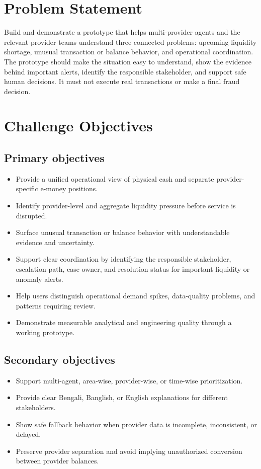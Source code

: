 \documentclass[11pt,a4paper]{article}
\begin{document}
\section{Problem Statement}
Build and demonstrate a prototype that helps multi-provider agents and the relevant provider teams understand three connected problems: upcoming liquidity shortage, unusual transaction or balance behavior, and operational coordination. The prototype should make the situation easy to understand, show the evidence behind important alerts, identify the responsible stakeholder, and support safe human decisions. It must not execute real transactions or make a final fraud decision.

\section{Challenge Objectives}
\subsection*{Primary objectives}
\begin{itemize}[noitemsep]
    \item Provide a unified operational view of physical cash and separate provider-specific e-money positions.
    \item Identify provider-level and aggregate liquidity pressure before service is disrupted.
    \item Surface unusual transaction or balance behavior with understandable evidence and uncertainty.
    \item Support clear coordination by identifying the responsible stakeholder, escalation path, case owner, and resolution status for important liquidity or anomaly alerts.
    \item Help users distinguish operational demand spikes, data-quality problems, and patterns requiring review.
    \item Demonstrate measurable analytical and engineering quality through a working prototype.
\end{itemize}

\subsection*{Secondary objectives}
\begin{itemize}[noitemsep]
    \item Support multi-agent, area-wise, provider-wise, or time-wise prioritization.
    \item Provide clear Bengali, Banglish, or English explanations for different stakeholders.
    \item Show safe fallback behavior when provider data is incomplete, inconsistent, or delayed.
    \item Preserve provider separation and avoid implying unauthorized conversion between provider balances.
\end{itemize}
\end{document}
